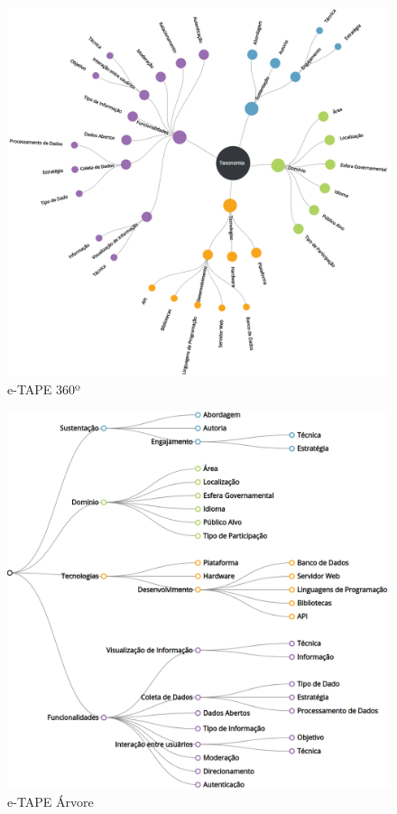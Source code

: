 \vspace{1cm}

\begin{figure}[!ht]
    \centering
    \includegraphics[scale=0.20]{./figuras/taxonomia-cropped.png}
    \caption{e-TAPE 360º}
    \label{fig:e-tape360}
\end{figure}

\vspace{1cm}

\begin{figure}[!ht]
    \centering
    \includegraphics[scale=0.20]{./figuras/taxonopart-horizontal.png}
    \caption{e-TAPE Árvore}
    \label{fig:e-tapeArvore}
\end{figure}
\newpage

